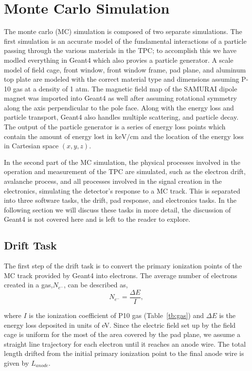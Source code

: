 \section{Monte Carlo Simulation}
The monte carlo (MC) simulation is composed of two separate simulations. The first simulation is an accurate model of the fundamental interactions of a particle passing through the various materials in the TPC; to accomplish this we have modled everything in Geant4 which also provies a particle generator. A scale model of field cage, front window, front window frame, pad plane, and aluminum top plate are modeled with the correct material type and dimensions assuming P-10 gas at a density of 1 atm. The magnetic field map of the SAMURAI dipole magnet was imported into Geant4 as well after assuming rotational symmetry along the axis perpendicular to the pole face. Along with the energy loss and particle transport, Geant4 also handles multiple scattering, and particle decay. The output of the particle generator is a series of energy loss points which contain the amount of energy lost in $\si{\kilo\electronvolt\per\centi\metre}$ and the location of the energy loss in Cartesian space $(x,y,z)$. 

In the second part of the MC simulation, the physical processes involved in the operation and measurement of the TPC are simulated, such as the electron drift, avalanche process, and all processes involved in the signal creation in the electronics, simulating the detector's response to a MC track. This is separated into three software tasks, the drift, pad response, and electronics tasks. In the following section we will discuss these tasks in more detail, the discussion of Geant4 is not covered here and is left to the reader to explore.  

\subsection{Drift Task}
 The first step of the drift task is to convert the primary ionization points of the MC track provided by Geant4 into electrons. The average number of electrons created in a gas,$N_{e^-}$, can be described as,
\begin{equation}
N_{e^{-}} =  \frac{\Delta E}{I},
\label{eq:kev2el}
\end{equation}
 
where $I$ is the ionization coefficient of P10 gas (Table~\ref{tb:gas}) and $\Delta E$ is the energy loss deposited in units of \si{\electronvolt}. Since the electric field set up by the field cage is uniform for the most of the area covered by the pad plane, we assume a straight line trajectory for each electron until it reaches an anode wire. The total length drifted from the initial primary ionization point to the final anode wire is given by $L_{anode}$. 

